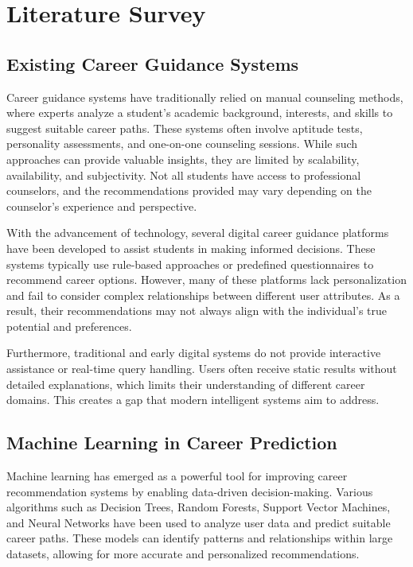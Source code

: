 \documentclass[12pt,a4paper]{report}
\begin{document}
{\chapter{Literature Survey}
\setlength{\parindent}{0pt}
\setlength{\parskip}{0.5em}
\justifying

\section{Existing Career Guidance Systems}

Career guidance systems have traditionally relied on manual counseling methods, where experts analyze a student’s academic background, interests, and skills to suggest suitable career paths. These systems often involve aptitude tests, personality assessments, and one-on-one counseling sessions. While such approaches can provide valuable insights, they are limited by scalability, availability, and subjectivity. Not all students have access to professional counselors, and the recommendations provided may vary depending on the counselor’s experience and perspective.

With the advancement of technology, several digital career guidance platforms have been developed to assist students in making informed decisions. These systems typically use rule-based approaches or predefined questionnaires to recommend career options. However, many of these platforms lack personalization and fail to consider complex relationships between different user attributes. As a result, their recommendations may not always align with the individual’s true potential and preferences.

Furthermore, traditional and early digital systems do not provide interactive assistance or real-time query handling. Users often receive static results without detailed explanations, which limits their understanding of different career domains. This creates a gap that modern intelligent systems aim to address.

\section{Machine Learning in Career Prediction}

Machine learning has emerged as a powerful tool for improving career recommendation systems by enabling data-driven decision-making. Various algorithms such as Decision Trees, Random Forests, Support Vector Machines, and Neural Networks have been used to analyze user data and predict suitable career paths. These models can identify patterns and relationships within large datasets, allowing for more accurate and personalized recommendations.

}
\end{document}
